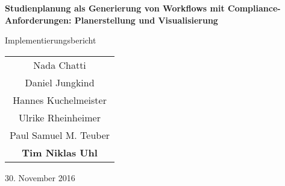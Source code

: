 \documentclass[titlepage=true, parskip=full]{scrartcl}
\begin{document}
	
\begin{titlepage}
	\centering
	{\huge \bfseries \sffamily Studienplanung als Generierung von Workflows mit Compliance-Anforderungen: Planerstellung und Visualisierung\par}
	\vspace{1cm}
	{\LARGE Implementierungsbericht\par}
	\vfill
	\begin{tabular}{>{\Large}c}
		Nada Chatti\\
		Daniel Jungkind\\
		Hannes Kuchelmeister\\
		Ulrike Rheinheimer\\
		Paul Samuel M. Teuber\\
		\textbf{Tim Niklas Uhl}
	\end{tabular}
	\vfill
	30. November 2016
\end{titlepage}
\tableofcontents
\pagebreak

%










\newpage
\begin{appendices}
	
\end{appendices}
\end{document}
